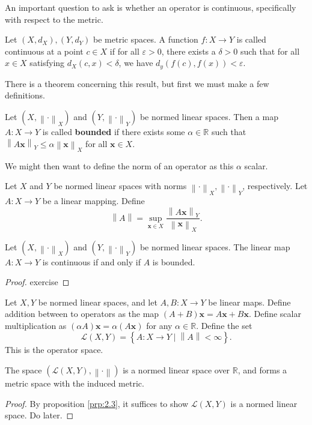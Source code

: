 \documentclass[11pt, letterpaper]{report}
\begin{document}
An important question to ask is whether an operator is continuous, specifically with respect to the metric.
\begin{definition}\label{dfn:2.11}
	Let $(X,d_X),(Y,d_Y)$ be metric spaces. A function $f : X \to Y$ is called continuous at a point $c\in X$ if for all $\varepsilon >0$, there exists a $\delta >0$ such that for all $x\in X$ satisfying $d_X(c,x)<\delta $, we have $d_y(f(c),f(x))<\varepsilon $.
\end{definition}
There is a theorem concerning this result, but first we must make a few definitions.
\begin{definition}[Bounded]\label{dfn:2.12}
	Let $\left( X,\left\lVert \cdot  \right\rVert _X \right) $ and $\left( Y,\left\lVert \cdot  \right\rVert _Y \right) $ be normed linear spaces. Then a map $A : X \to Y$ is called \textbf{bounded} if there exists some $\alpha \in\mathbb{R}$ such that $\left\lVert A \mathbf{x} \right\rVert _Y \leq \alpha \left\lVert \mathbf{x} \right\rVert _X$ for all $\mathbf{x}\in X$.
\end{definition}
We might then want to define the norm of an operator as this $\alpha $ scalar.
\begin{definition}\label{dfn:2.13}
	Let $X$ and $Y$ be normed linear spaces with norms $\left\lVert \cdot  \right\rVert _X,\left\lVert \cdot  \right\rVert _Y$, respectively. Let $A : X \to Y$ be a linear mapping. Define 
	\[
		\left\lVert A \right\rVert =\sup_{\mathbf{x}\in X}\frac{\left\lVert A \mathbf{x} \right\rVert_Y }{\left\lVert \mathbf{x} \right\rVert_X }
	.\]
\end{definition}
\begin{proposition}\label{prp:2.4}
	Let $(X,\left\lVert \cdot  \right\rVert _X)$ and $\left( Y,\left\lVert \cdot  \right\rVert _Y \right) $ be normed linear spaces. The linear map $A : X \to Y$ is continuous if and only if $A$ is bounded.
\end{proposition}
\begin{proof}
	exercise
\end{proof}
\begin{definition}\label{dfn:2.14}
	Let $X,Y$ be normed linear spaces, and let $A,B : X \to Y$ be linear maps. Define addition between to operators as the map $\left( A+B \right) \mathbf{x}=A \mathbf{x}+B \mathbf{x}$. Define scalar multiplication as $\left( \alpha A \right) \mathbf{x}=\alpha \left( A \mathbf{x} \right) $ for any $\alpha \in\mathbb{R}$. Define the set
	\[
		\mathscr{L} \left( X,Y \right) =\left\{ A : X \to Y \mid \left\lVert A \right\rVert <\infty \right\} 
	.\]
	This is the operator space.
\end{definition}
\begin{proposition}\label{prp:2.5}
	The space $(\mathscr{L}  (X,Y),\left\lVert \cdot  \right\rVert )$ is a normed linear space over $\mathbb{R}$, and forms a metric space with the induced metric.
\end{proposition}
\begin{proof}
	By proposition \ref{prp:2.3}, it suffices to show $\mathscr{L}  (X,Y)$ is a normed linear space. Do later.
\end{proof}
\end{document}
